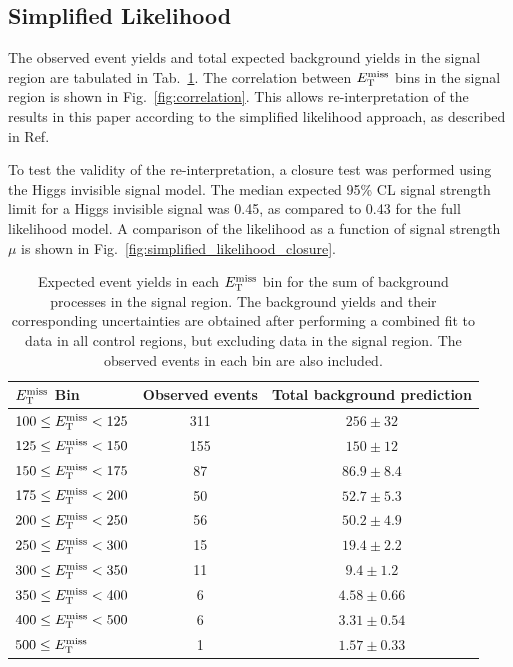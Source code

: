 \clearpage
\subsection{Simplified Likelihood}
The observed event yields and total expected background yields in the signal region are tabulated in Tab.~\ref{tab:binnedCounts_sr}.
The correlation between $E_\mathrm{T}^{\mathrm{miss}}$ bins in the signal region is shown in Fig.~\ref{fig:correlation}.
This allows re-interpretation of the results in this paper according to the simplified likelihood approach, as described in Ref.~\cite{simplified-likelihood}

To test the validity of the re-interpretation, a closure test was performed using the Higgs invisible signal model.
The median expected 95\% CL signal strength limit for a Higgs invisible signal was 0.45, as compared to 0.43 for the full likelihood model.
A comparison of the likelihood as a function of signal strength $\mu$ is shown in Fig.~\ref{fig:simplified_likelihood_closure}.

\begin{table}[hbtp]
  \caption{
    Expected event yields in each $E_\mathrm{T}^{\mathrm{miss}}$ bin for the sum of background processes in the signal region.
    The background yields and their corresponding uncertainties are obtained after performing a combined fit
    to data in all control regions, but excluding data in the signal region.
    The observed events in each bin are also included.
  }
  \label{tab:binnedCounts_sr}
  \begin{center}
{\footnotesize
  \begin{tabular}{lcc}
\hline 
$E_\mathrm{T}^{\mathrm{miss}}$ Bin             & Observed events & Total background prediction \\
\hline
$100 \leq E_\mathrm{T}^{\mathrm{miss}} < 125$  & 311             & $256\pm32$           \\
$125 \leq E_\mathrm{T}^{\mathrm{miss}} < 150$  & 155             & $150\pm12$           \\
$150 \leq E_\mathrm{T}^{\mathrm{miss}} < 175$  & 87              & $86.9\pm8.4$         \\
$175 \leq E_\mathrm{T}^{\mathrm{miss}} < 200$  & 50              & $52.7\pm5.3$         \\
$200 \leq E_\mathrm{T}^{\mathrm{miss}} < 250$  & 56              & $50.2\pm4.9$         \\
$250 \leq E_\mathrm{T}^{\mathrm{miss}} < 300$  & 15              & $19.4\pm2.2$         \\
$300 \leq E_\mathrm{T}^{\mathrm{miss}} < 350$  & 11              & $9.4\pm1.2$          \\
$350 \leq E_\mathrm{T}^{\mathrm{miss}} < 400$  & 6               & $4.58\pm0.66$        \\
$400 \leq E_\mathrm{T}^{\mathrm{miss}} < 500$  & 6               & $3.31\pm0.54$        \\
$500 \leq E_\mathrm{T}^{\mathrm{miss}}$        & 1               & $1.57\pm0.33$        \\
\hline 
  \end{tabular}
}
  \end{center}
\end{table}

